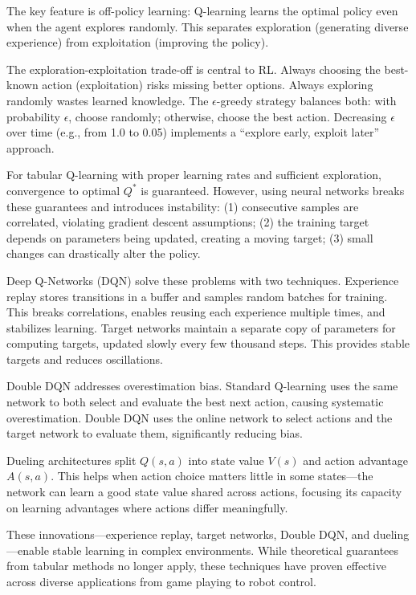 The key feature is off-policy learning: Q-learning learns the optimal policy even when the agent explores randomly. This separates exploration (generating diverse experience) from exploitation (improving the policy).

The exploration-exploitation trade-off is central to RL. Always choosing the best-known action (exploitation) risks missing better options. Always exploring randomly wastes learned knowledge. The $\epsilon$-greedy strategy balances both: with probability $\epsilon$, choose randomly; otherwise, choose the best action. Decreasing $\epsilon$ over time (e.g., from 1.0 to 0.05) implements a ``explore early, exploit later'' approach.

For tabular Q-learning with proper learning rates and sufficient exploration, convergence to optimal $Q^*$ is guaranteed. However, using neural networks breaks these guarantees and introduces instability: (1) consecutive samples are correlated, violating gradient descent assumptions; (2) the training target depends on parameters being updated, creating a moving target; (3) small changes can drastically alter the policy.

Deep Q-Networks (DQN) solve these problems with two techniques. Experience replay stores transitions in a buffer and samples random batches for training. This breaks correlations, enables reusing each experience multiple times, and stabilizes learning. Target networks maintain a separate copy of parameters for computing targets, updated slowly every few thousand steps. This provides stable targets and reduces oscillations.

Double DQN addresses overestimation bias. Standard Q-learning uses the same network to both select and evaluate the best next action, causing systematic overestimation. Double DQN uses the online network to select actions and the target network to evaluate them, significantly reducing bias.

Dueling architectures split $Q(s,a)$ into state value $V(s)$ and action advantage $A(s,a)$. This helps when action choice matters little in some states---the network can learn a good state value shared across actions, focusing its capacity on learning advantages where actions differ meaningfully.

These innovations---experience replay, target networks, Double DQN, and dueling---enable stable learning in complex environments. While theoretical guarantees from tabular methods no longer apply, these techniques have proven effective across diverse applications from game playing to robot control.

